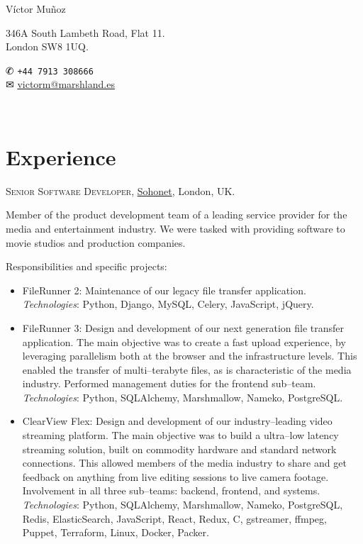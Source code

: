 \documentclass[11pt]{article}
\newcommand{\years}[1]{\marginnote{\scriptsize #1}}
\begin{document}
\begin{minipage}[m]{.3\textwidth}
	{\LARGE Víctor Muñoz}
\end{minipage}
\begin{minipage}[m]{.45\textwidth}
	346A South Lambeth Road, Flat 11.\\
	London SW8 1UQ.
\end{minipage}
\begin{minipage}[m]{.25\textwidth}
	{\dingbats ✆} \texttt{+44 7913 308666}\\
	{\dingbats ✉} \href{mailto:victorm@marshland.es}
	                    {victorm@marshland.es}
\end{minipage}\\[.05cm]


\section*{Experience}  %
\noindent

\years{2018--2020}\textsc{Senior Software Developer}, \href{https://sohonet.com}{Sohonet}, London, UK.

Member of the product development team of a leading service provider for the media and entertainment industry. We were tasked with providing software to movie studios and production companies.

Responsibilities and specific projects:
\begin{itemize}
	\item  FileRunner 2: Maintenance of our legacy file transfer application.\\
	\textit{Technologies}: Python, Django, MySQL, Celery, JavaScript, jQuery.
	\item  FileRunner 3: Design and development of our next generation file transfer application. The main objective was to create a fast upload experience, by leveraging parallelism both at the browser and the infrastructure levels. This enabled the transfer of multi--terabyte files, as is characteristic of the media industry. Performed management duties for the frontend sub--team.\\
	\textit{Technologies}: Python, SQLAlchemy, Marshmallow, Nameko, PostgreSQL.
	\item  {ClearView Flex}: Design and development of our industry--leading video streaming platform. The main objective was to build a ultra--low latency streaming solution, built on commodity hardware and standard network connections. This allowed members of the media industry to share and get feedback on anything from live editing sessions to live camera footage. Involvement in all three sub--teams: backend, frontend, and systems.\\
	\textit{Technologies}: Python, SQLAlchemy, Marshmallow, Nameko, PostgreSQL, Redis, ElasticSearch, JavaScript, React, Redux, C, gstreamer, ffmpeg, Puppet, Terraform, Linux, Docker, Packer.
\end{itemize}
\end{document}
